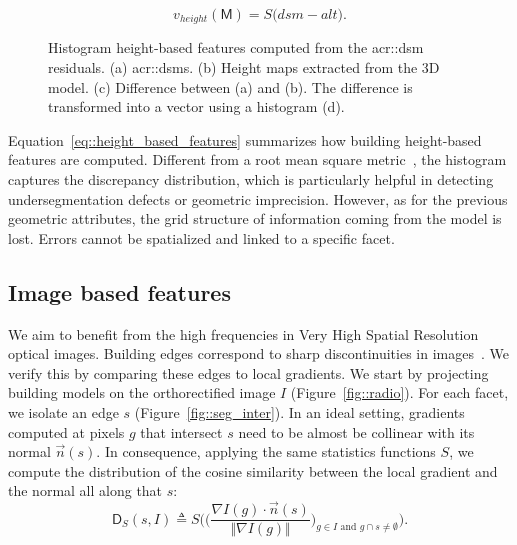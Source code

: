         \begin{equation}
            \label{eq::height_based_features}
            v_{height}(\mathsf{M}) = S\big( dsm - alt \big).
        \end{equation}
        \begin{figure}[H]
            
            \caption{
                \label{fig::height_based_features}
                Histogram height-based features computed from the \gls{acr::dsm} residuals.
                (a) \glspl{acr::dsm}.
                (b) Height maps extracted from the 3D model.
                (c) Difference between (a) and (b).
                The difference is transformed into a vector using a histogram (d).
            }
        \end{figure}
        Equation~\ref{eq::height_based_features} summarizes how building height-based features are computed. Different from a root mean square metric~\parencite{lafarge2012creating,Poullis2013}, the histogram captures the discrepancy distribution, which is particularly helpful in detecting undersegmentation defects or geometric imprecision. However, as for the previous geometric attributes, the grid structure of information coming from the model is lost. Errors cannot be spatialized and linked to a specific facet.

    \subsection{Image based features}
        We aim to benefit from the high frequencies in Very High Spatial Resolution optical images. Building edges correspond to sharp discontinuities in images~\parencite{ortner2007building}. We verify this by comparing these edges to local gradients. We start by projecting building models on the orthorectified image $I$ (Figure~\ref{fig::radio}). For each facet, we isolate an edge $s$ (Figure~\ref{fig::seg_inter}). In an ideal setting, gradients computed at pixels $g$ that intersect $s$ need to be almost be collinear with its normal $\vec{n}(s)$. In consequence, applying the same statistics functions $S$, we compute the distribution of the cosine similarity between the local gradient and the normal all along that $s$:
        \begin{equation}
            \label{eq::corr_seg}
            \mathsf{D}_S(s, I) \triangleq S \bigg( \Big(\frac{\nabla I(g) \cdot \vec{n}(s)}{\Vert \nabla I(g)\Vert}\Big)_{g \in I \textrm{ and } g \cap s \neq \emptyset} \bigg).
        \end{equation}

